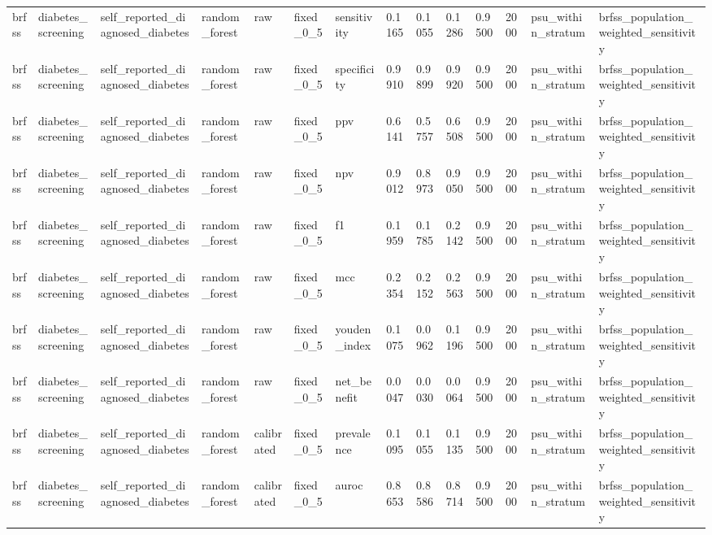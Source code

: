 \begin{tabular}{llllllllllllll}
brfss & diabetes\_screening & self\_reported\_diagnosed\_diabetes & random\_forest & raw & fixed\_0\_5 & sensitivity & 0.1165 & 0.1055 & 0.1286 & 0.9500 & 2000 & psu\_within\_stratum & brfss\_population\_weighted\_sensitivity \\
brfss & diabetes\_screening & self\_reported\_diagnosed\_diabetes & random\_forest & raw & fixed\_0\_5 & specificity & 0.9910 & 0.9899 & 0.9920 & 0.9500 & 2000 & psu\_within\_stratum & brfss\_population\_weighted\_sensitivity \\
brfss & diabetes\_screening & self\_reported\_diagnosed\_diabetes & random\_forest & raw & fixed\_0\_5 & ppv & 0.6141 & 0.5757 & 0.6508 & 0.9500 & 2000 & psu\_within\_stratum & brfss\_population\_weighted\_sensitivity \\
brfss & diabetes\_screening & self\_reported\_diagnosed\_diabetes & random\_forest & raw & fixed\_0\_5 & npv & 0.9012 & 0.8973 & 0.9050 & 0.9500 & 2000 & psu\_within\_stratum & brfss\_population\_weighted\_sensitivity \\
brfss & diabetes\_screening & self\_reported\_diagnosed\_diabetes & random\_forest & raw & fixed\_0\_5 & f1 & 0.1959 & 0.1785 & 0.2142 & 0.9500 & 2000 & psu\_within\_stratum & brfss\_population\_weighted\_sensitivity \\
brfss & diabetes\_screening & self\_reported\_diagnosed\_diabetes & random\_forest & raw & fixed\_0\_5 & mcc & 0.2354 & 0.2152 & 0.2563 & 0.9500 & 2000 & psu\_within\_stratum & brfss\_population\_weighted\_sensitivity \\
brfss & diabetes\_screening & self\_reported\_diagnosed\_diabetes & random\_forest & raw & fixed\_0\_5 & youden\_index & 0.1075 & 0.0962 & 0.1196 & 0.9500 & 2000 & psu\_within\_stratum & brfss\_population\_weighted\_sensitivity \\
brfss & diabetes\_screening & self\_reported\_diagnosed\_diabetes & random\_forest & raw & fixed\_0\_5 & net\_benefit & 0.0047 & 0.0030 & 0.0064 & 0.9500 & 2000 & psu\_within\_stratum & brfss\_population\_weighted\_sensitivity \\
brfss & diabetes\_screening & self\_reported\_diagnosed\_diabetes & random\_forest & calibrated & fixed\_0\_5 & prevalence & 0.1095 & 0.1055 & 0.1135 & 0.9500 & 2000 & psu\_within\_stratum & brfss\_population\_weighted\_sensitivity \\
brfss & diabetes\_screening & self\_reported\_diagnosed\_diabetes & random\_forest & calibrated & fixed\_0\_5 & auroc & 0.8653 & 0.8586 & 0.8714 & 0.9500 & 2000 & psu\_within\_stratum & brfss\_population\_weighted\_sensitivity \\

\end{tabular}
